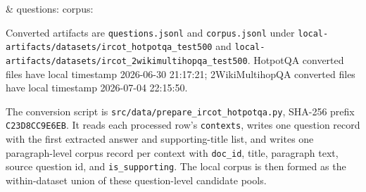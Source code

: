 \begin{table}[t]
\begin{threeparttable}
\begin{tabularx}{\textwidth}
 &
questions:
corpus:
 \\
\bottomrule
\end{tabularx}
\begin{tablenotes}
\footnotesize
\item Converted artifacts are \texttt{questions.jsonl} and \texttt{corpus.jsonl} under \texttt{local-artifacts/datasets/ircot\_hotpotqa\_test500} and \texttt{local-artifacts/datasets/ircot\_2wikimultihopqa\_test500}. HotpotQA converted files have local timestamp 2026-06-30 21:17:21; 2WikiMultihopQA converted files have local timestamp 2026-07-04 22:15:50.
\item The conversion script is \texttt{src/data/prepare\_ircot\_hotpotqa.py}, SHA-256 prefix \texttt{C23D8CC9E6EB}. It reads each processed row's \texttt{contexts}, writes one question record with the first extracted answer and supporting-title list, and writes one paragraph-level corpus record per context with \texttt{doc\_id}, title, paragraph text, source question id, and \texttt{is\_supporting}. The local corpus is then formed as the within-dataset union of these question-level candidate pools.
\end{tablenotes}
\end{threeparttable}
\end{table}
